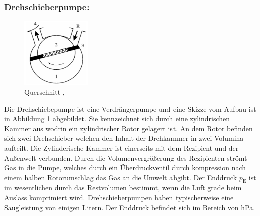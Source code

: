 \subsubsection{Drehschieberpumpe:}
\begin{figure}
    \vspace{-1cm}
    \centering
    \includegraphics[width=0.3\textwidth]{./picture/Drehschieberpumpe.png}
    \caption{Querschnitt \cite{Dreh},\cite{Jena}}
    \label{fig:Dreh}
\end{figure}
Die Drehschiebepumpe ist eine Verdrängerpumpe und eine Skizze vom Aufbau ist in Abbildung \ref{fig:Dreh} abgebildet. Sie kennzeichnet sich durch eine zylindrischen Kammer aus wodrin ein zylindrischer Rotor gelagert ist. An dem Rotor befinden sich zwei Drehschieber welchen den Inhalt der Drehkammer in zwei Volumina aufteilt. Die Zylinderische Kammer ist einerseits mit dem Rezipient und der Außenwelt verbunden. Durch die Volumenvergrößerung des Rezipienten strömt Gas in die Pumpe, welches durch ein Überdruckventil durch kompression nach einem halben Rotorumschlag das Gas an die Umwelt abgibt. Der Enddruck $p_\text{E}$ ist im wesentlichen durch das Restvolumen bestimmt, wenn die Luft grade beim Auslass komprimiert wird. Drehschieberpumpen haben typischerweise eine Saugleistung von einigen Litern. Der Enddruck befindet sich im Bereich von hPa.
